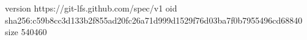 version https://git-lfs.github.com/spec/v1
oid sha256:c59b8cc3d133b2f855ad20fc26a71d999d1529f76d03ba7f0b7955496cd68840
size 540460

